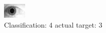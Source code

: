 \begin{figure}[h!]
\begin{center}
\includegraphics[width=0.60\columnwidth]{figures/ID1933_class_4_target_3.png}
\end{center}
\caption{ Classification: 4 actual target: 3}
\label{fig:ID1933_class_4_target_3}
\end{figure}
